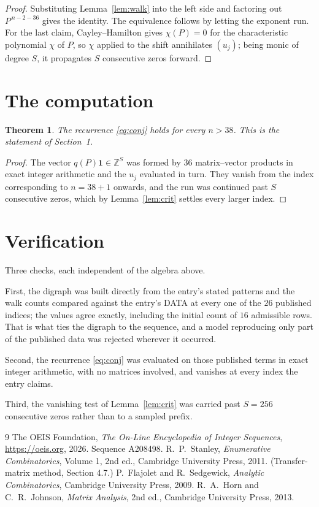 \documentclass[11pt,a4paper]{article}
\theoremstyle{plain}
\newtheorem{theorem}{Theorem}
\theoremstyle{definition}
\begin{document}
\begin{proof}
Substituting Lemma~\ref{lem:walk} into the left side and factoring out
$P^{\,n-2-36}$ gives the identity. The equivalence follows by letting the exponent
run. For the last claim, Cayley--Hamilton gives $\chi(P)=0$ for the characteristic
polynomial $\chi$ of $P$, so $\chi$ applied to the shift annihilates $(u_j)$; being monic of
degree $S$, it propagates $S$ consecutive zeros forward.
\end{proof}

\section{The computation}

\begin{theorem}
The recurrence \eqref{eq:conj} holds for every $n>38$. This is the statement of
Section~1.
\end{theorem}

\begin{proof}
The vector $q(P)\mathbf{1}\in\mathbb{Z}^{S}$ was formed by $36$ matrix--vector
products in exact integer arithmetic and the $u_j$ evaluated in turn. They vanish from the
index corresponding to $n=38+1$ onwards, and the run was continued past $S$ consecutive
zeros, which by Lemma~\ref{lem:crit} settles every larger index.
\end{proof}

\section{Verification}

Three checks, each independent of the algebra above.

First, the digraph was built directly from the entry's stated patterns and the walk counts
compared against the entry's DATA at every one of the $26$ published indices; the
values agree exactly, including the initial count of $16$ admissible rows. That is
what ties the digraph to the sequence, and a model reproducing only part of the published
data was rejected wherever it occurred.

Second, the recurrence \eqref{eq:conj} was evaluated on those published terms in exact
integer arithmetic, with no matrices involved, and vanishes at every index the entry claims.

Third, the vanishing test of Lemma~\ref{lem:crit} was carried past $S=256$ consecutive
zeros rather than to a sampled prefix.

\begin{thebibliography}{9}
 The OEIS Foundation, \emph{The On-Line Encyclopedia of Integer
Sequences}, \url{https://oeis.org}, 2026. Sequence A208498.
 R.~P.~Stanley, \emph{Enumerative Combinatorics}, Volume 1, 2nd ed.,
Cambridge University Press, 2011. (Transfer-matrix method, Section 4.7.)
 P.~Flajolet and R.~Sedgewick, \emph{Analytic Combinatorics}, Cambridge
University Press, 2009.
 R.~A.~Horn and C.~R.~Johnson, \emph{Matrix Analysis}, 2nd ed., Cambridge
University Press, 2013.
\end{thebibliography}
\end{document}
